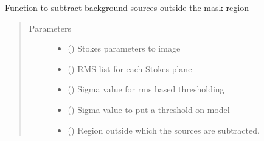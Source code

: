 \documentclass[letterpaper,10pt,english]{sphinxmanual}
\begin{document}
\begin{fulllineitems}
\begin{fulllineitems}
\label{\detokenize{paircars:paircars.fullpol_selfcal_LTS.PolSelfcal.subtract_background_sources}}
\sphinxAtStartPar
Function to subtract background sources outside the mask region
\begin{quote}\begin{description}
\item[{Parameters}] \leavevmode\begin{itemize}
\item {} 
\sphinxAtStartPar
{} () \textendash{} Stokes parameters to image

\item {} 
\sphinxAtStartPar
{} () \textendash{} RMS list for each Stokes plane

\item {} 
\sphinxAtStartPar
{} () \textendash{} Sigma value for rms based thresholding

\item {} 
\sphinxAtStartPar
{} () \textendash{} Sigma value to put a threshold on model

\item {} 
\sphinxAtStartPar
{} () \textendash{} Region outside which the sources are subtracted.


\end{itemize}
\end{description}
\end{quote}
\end{fulllineitems}
\end{fulllineitems}
\end{document}
